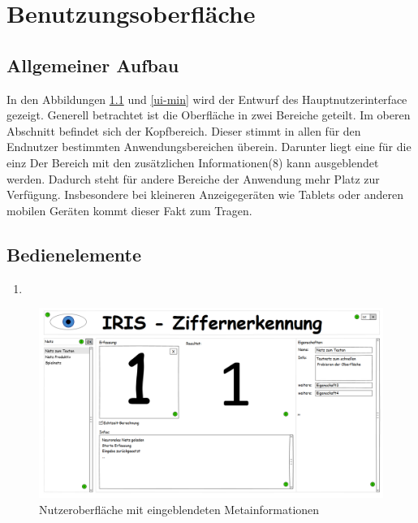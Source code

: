 \chapter{Benutzungsoberfläche}
\section{Allgemeiner Aufbau}
 In den Abbildungen \ref{ui-max} und \ref{ui-min} wird der  Entwurf des Hauptnutzerinterface gezeigt. Generell betrachtet ist die Oberfläche in zwei Bereiche geteilt. Im oberen Abschnitt befindet sich der Kopfbereich. Dieser stimmt in allen für den Endnutzer bestimmten Anwendungsbereichen überein. Darunter liegt eine für die einz
 Der Bereich mit den zusätzlichen Informationen(8) kann ausgeblendet werden. Dadurch steht für andere Bereiche der Anwendung mehr Platz zur Verfügung. Insbesondere bei kleineren Anzeigegeräten wie Tablets oder anderen mobilen Geräten kommt dieser Fakt zum Tragen. 
 
 
 
 \section{Bedienelemente}
 \begin{enumerate}
 	\item 
 \end{enumerate}
 
\begin{figure}[ht]
 
 	\centering
 	\includegraphics[height=0.8\textwidth, angle=90]{Abbildungen/UI-Mocks/Main-Ui.png}
 	\caption{Nutzeroberfläche mit eingeblendeten Metainformationen}
 	\label{ui-max}
\end{figure}

